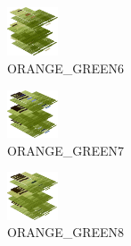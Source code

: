 \hspace{0.1cm}
\begin{minipage}[b]{0.15\linewidth}
\begin{figure}[H]                                                          
  \centering                                                             
  \begin{adjustbox}{width=1.5cm,center}                                   
  \includegraphics[width=1.5cm]{src/colorspace_colourflow/flows/colourflow_230-45.png}%
  \end{adjustbox}                                                        
\caption*{ORANGE\_GREEN6}                                           
\end{figure}                                                               
\end{minipage}
\hspace{0.1cm}
\begin{minipage}[b]{0.15\linewidth}
\begin{figure}[H]                                                          
  \centering                                                             
  \begin{adjustbox}{width=1.5cm,center}                                   
  \includegraphics[width=1.5cm]{src/colorspace_colourflow/flows/colourflow_231-45.png}%
  \end{adjustbox}                                                        
\caption*{ORANGE\_GREEN7}                                           
\end{figure}                                                               
\end{minipage}
\hspace{0.1cm}
\begin{minipage}[b]{0.15\linewidth}
\begin{figure}[H]                                                          
  \centering                                                             
  \begin{adjustbox}{width=1.5cm,center}                                   
  \includegraphics[width=1.5cm]{src/colorspace_colourflow/flows/colourflow_232-45.png}%
  \end{adjustbox}                                                        
\caption*{ORANGE\_GREEN8}                                           
\end{figure}                                                               
\end{minipage}
